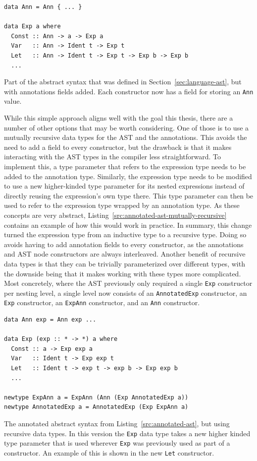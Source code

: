 \documentclass[fontsize=11pt,a4paper,parskip=half,numbers=noenddot]{scrartcl}
\newcommand{\hask}[1]{\texttt{#1}}
\begin{document}
\begin{listing}[!ht]
\begin{verbatim}
data Ann = Ann { ... }

data Exp a where
  Const :: Ann -> a -> Exp a
  Var   :: Ann -> Ident t -> Exp t
  Let   :: Ann -> Ident t -> Exp t -> Exp b -> Exp b
  ...
\end{verbatim}
\caption{Part of the abstract syntax that was defined in Section~\ref{sec:language-ast}, but with annotations fields added. Each constructor now has a field for storing an \hask{Ann} value.}\label{src:annotated-ast}
\end{listing}

While this simple approach aligns well with the goal this thesis, there are a
number of other options that may be worth considering. One of those is to use a
mutually recursive data types for the AST and the annotations. This avoids the
need to add a field to every constructor, but the drawback is that it makes
interacting with the AST types in the compiler less straightforward. To
implement this, a type parameter that refers to the expression type needs to be
added to the annotation type. Similarly, the expression type needs to be
modified to use a new higher-kinded type parameter for its nested expressions
instead of directly reusing the expression's own type there. This type parameter
can then be used to refer to the expression type wrapped by an annotation type.
As these concepts are very abstract,
Listing~\ref{src:annotated-ast-mutually-recursive} contains an example of how
this would work in practice. In summary, this change turned the expression type
from an inductive type to a recursive type. Doing so avoids having to add
annotation fields to every constructor, as the annotations and AST node
constructors are always interleaved. Another benefit of recursive data types is
that they can be trivially parameterized over different types, with the downside
being that it makes working with these types more complicated. Most concretely,
where the AST previously only required a single \hask{Exp} constructor per
nesting level, a single level now consists of an \hask{AnnotatedExp}
constructor, an \hask{Exp} constructor, an \hask{ExpAnn} constructor, and an
\hask{Ann} constructor.

\begin{listing}[!ht]
\begin{verbatim}
data Ann exp = Ann exp ...

data Exp (exp :: * -> *) a where
  Const :: a -> Exp exp a
  Var   :: Ident t -> Exp exp t
  Let   :: Ident t -> exp t -> exp b -> Exp exp b
  ...

newtype ExpAnn a = ExpAnn (Ann (Exp AnnotatedExp a))
newtype AnnotatedExp a = AnnotatedExp (Exp ExpAnn a)
\end{verbatim}
\caption{The annotated abstract syntax from Listing~\ref{src:annotated-ast}, but using recursive data types. In this version the \hask{Exp} data type takes a new higher kinded type parameter that is used wherever \hask{Exp} was previously used as part of a constructor. An example of this is shown in the new \hask{Let} constructor.}\label{src:annotated-ast-mutually-recursive}
\end{listing}
\end{document}
